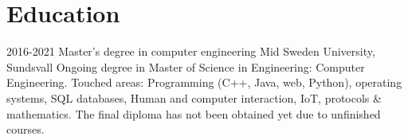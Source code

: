 \section{Education}



\begin{entrylist}
  \entry
    {2016-2021}
    {Master's degree in computer engineering}
    {Mid Sweden University, Sundsvall}
    {%
      Ongoing degree in Master of Science in Engineering: Computer\\Engineering. Touched areas: Programming (C++, Java, web, Python), operating systems, SQL databases, Human and computer interaction, IoT, protocols \& mathematics. The final diploma has not been obtained yet due to unfinished courses.
      }
\end{entrylist}
